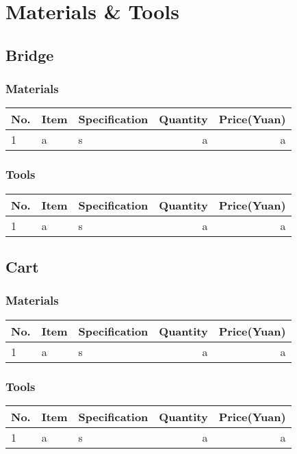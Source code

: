 \section{Materials \& Tools}
\subsection{Bridge}
\subsubsection{Materials}


\newcommand{\beginMyTabular}{
    \begin{tabular}{p{2cm}p{3cm}p{7cm}rr}
}
\begin{center}
\beginMyTabular
\hline
No. & Item & Specification & Quantity & Price(Yuan) \\
\hline
1 & a & s & a & a
\end{tabular}
\end{center}


\subsubsection{Tools}


\begin{center}
\beginMyTabular
\hline
No. & Item & Specification & Quantity & Price(Yuan) \\
\hline
1 & a & s & a & a
\end{tabular}
\end{center}

\subsection{Cart}
\subsubsection{Materials}


\begin{center}
\beginMyTabular
\hline
No. & Item & Specification & Quantity & Price(Yuan) \\
\hline
1 & a & s & a & a
\end{tabular}
\end{center}
\subsubsection{Tools}

\begin{center}
\beginMyTabular
\hline
No. & Item & Specification & Quantity & Price(Yuan) \\
\hline
1 & a & s & a & a
\end{tabular}
\end{center}